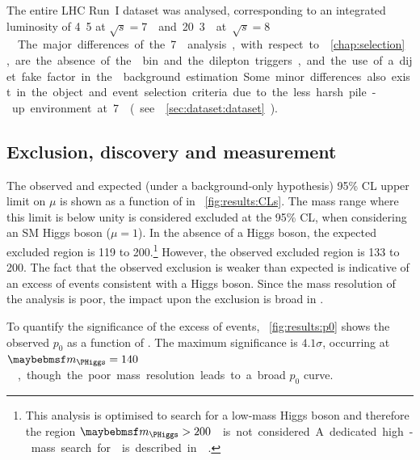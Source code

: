 
The entire LHC Run~I dataset was analysed, corresponding to an integrated luminosity of 
\unit{4.5}{\invfb} at \unit{$\sqrt{s} = 7$}{\TeV} and \unit{20.3}{\invfb} at 
\unit{$\sqrt{s} = 8$}{\TeV}. The major differences of the \unit{7}{\TeV} analysis, with 
respect to \Chapter~\ref{chap:selection}, are the absence of the \twojet bin and the 
dilepton triggers, and the use of a dijet fake factor in the \Wjets background estimation. 
Some minor differences also exist in the object and event selection criteria due to the less 
harsh pile-up environment at \unit{7}{\TeV} (see \Section~\ref{sec:dataset:dataset}).



\subsection{Exclusion, discovery and measurement}
\label{sec:results:limits}

The observed and expected (under a background-only hypothesis) 95\% CL upper limit on $\mu$ 
is shown as a function of \mH in \Figure~\ref{fig:results:CLs}. The mass range where this 
limit is below unity is considered excluded at the 95\% CL, when considering an SM Higgs 
boson ($\mu = 1$). In the absence of a Higgs boson, the expected excluded region is 
\unit{119}{\GeV} to \unit{200}{\GeV}.\footnote{
	This analysis is optimised to search for a low-mass Higgs boson and therefore the region 
	\unit{$\mH > 200$}{\GeV} is not considered. A dedicated high-mass search for \HWW is 
	described in \Reference~\cite{HWW-highmass}.
}
However, the observed excluded region is \unit{133}{\GeV} to \unit{200}{\GeV}.
The fact that the observed exclusion is weaker than expected is indicative of an excess of 
events consistent with a Higgs boson. Since the mass resolution of the \HWW analysis is 
poor, the impact upon the exclusion is broad in \mH.

To quantify the significance of the excess of events, \Figure~\ref{fig:results:p0} shows the 
observed $p_0$ as a function of \mH. The maximum significance is $4.1\sigma$, occurring at 
\unit{$\mH = 140$}{\GeV}, though the poor mass resolution leads to a broad $p_0$ curve. 

